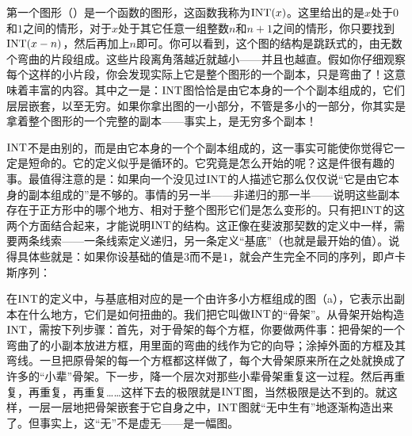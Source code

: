 第一个图形（）是一个函数的图形，这函数我称为$\operatorname{INT}(x)$。这里给出的是$x$处于$0$和$1$之间的情形，对于$x$处于其它任意一组整数$n$和$n+1$之间的情形，你只要找到$\operatorname{INT}(x-n)$，然后再加上$n$即可。你可以看到，这个图的结构是跳跃式的，由无数个弯曲的片段组成。这些片段离角落越近就越小——并且也越直。假如你仔细观察每个这样的小片段，你会发现实际上它是整个图形的一个副本，只是弯曲了！这意味着丰富的内容。其中之一是：$\operatorname{INT}$图恰恰是由它本身的一个个副本组成的，它们层层嵌套，以至无穷。如果你拿出图的一小部分，不管是多小的一部分，你其实是拿着整个图形的一个完整的副本——事实上，是无穷多个副本！

$\operatorname{INT}$不是由别的，而是由它本身的一个个副本组成的，这一事实可能使你觉得它一定是短命的。它的定义似乎是循环的。它究竟是怎么开始的呢？这是件很有趣的事。最值得注意的是：如果向一个没见过$\operatorname{INT}$的人描述它那么仅仅说“它是由它本身的副本组成的”是不够的。事情的另一半——非递归的那一半——说明这些副本存在于正方形中的哪个地方、相对于整个图形它们是怎么变形的。只有把$\operatorname{INT}$的这两个方面结合起来，才能说明$\operatorname{INT}$的结构。这正像在斐波那契数的定义中一样，需要两条线索——一条线索定义递归，另一条定义“基底”（也就是最开始的值）。说得具体些就是：如果你设基础的值是$3$而不是$1$，就会产生完全不同的序列，即卢卡斯序列：
\begin{figure}[H]
\end{figure}

在$\operatorname{INT}$的定义中，与基底相对应的是一个由许多小方框组成的图（a），它表示出副本在什么地方，它们是如何扭曲的。我们把它叫做$\operatorname{INT}$的“骨架”。从骨架开始构造$\operatorname{INT}$，需按下列步骤：首先，对于骨架的每个方框，你要做两件事：把骨架的一个弯曲了的小副本放进方框，用里面的弯曲的线作为它的向导；涂掉外面的方框及其弯线。一旦把原骨架的每一个方框都这样做了，每个大骨架原来所在之处就换成了许多的“小辈”骨架。下一步，降一个层次对那些小辈骨架重复这一过程。然后再重复，再重复，再重复……这样下去的极限就是$\operatorname{INT}$图，当然极限是达不到的。就这样，一层一层地把骨架嵌套于它自身之中，$\operatorname{INT}$图就“无中生有”地逐渐构造出来了。但事实上，这“无”不是虚无——是一幅图。

